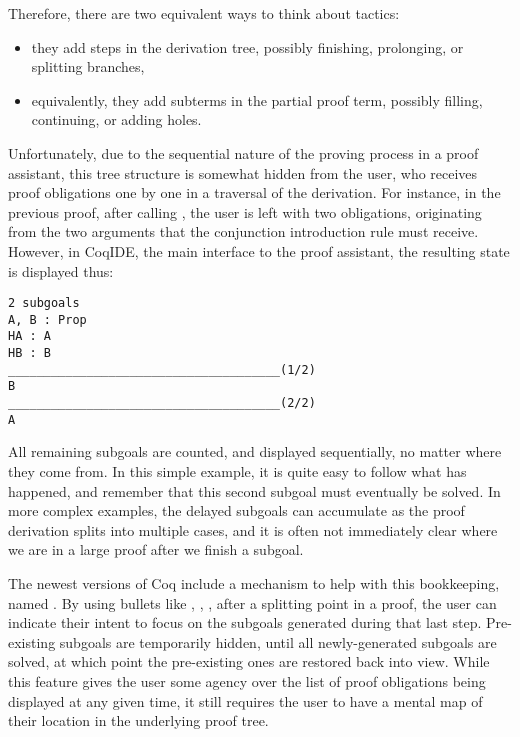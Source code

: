 Therefore, there are two equivalent ways to think about tactics:

\begin{itemize}

  \item they add steps in the derivation tree, possibly finishing, prolonging, or splitting branches,

  \item equivalently, they add subterms in the partial proof term, possibly filling, continuing, or adding holes.

\end{itemize}

Unfortunately, due to the sequential nature of the proving process in a proof
assistant, this tree structure is somewhat hidden from the user, who receives
proof obligations one by one in a traversal of the derivation.  For instance, in
the previous proof, after calling , the user is left with two
obligations, originating from the two arguments that the conjunction
introduction rule must receive.  However, in CoqIDE, the main interface to the
proof assistant, the resulting state is displayed thus:

\begin{verbatim}
2 subgoals
A, B : Prop
HA : A
HB : B
______________________________________(1/2)
B
______________________________________(2/2)
A
\end{verbatim}

All remaining subgoals are counted, and displayed sequentially, no matter where
they come from.  In this simple example, it is quite easy to follow what has
happened, and remember that this second subgoal must eventually be solved.  In
more complex examples, the delayed subgoals can accumulate as the proof
derivation splits into multiple cases, and it is often not immediately clear
where we are in a large proof after we finish a subgoal.

The newest versions of Coq include a mechanism to help with this bookkeeping,
named .  By using bullets like \coqinline{+}, \coqinline{-},
\coqinline{*}, after a splitting point in a proof, the user can indicate their
intent to focus on the subgoals generated during that last step.  Pre-existing
subgoals are temporarily hidden, until all newly-generated subgoals are solved,
at which point the pre-existing ones are restored back into view.  While this
feature gives the user some agency over the list of proof obligations being
displayed at any given time, it still requires the user to have a mental map of
their location in the underlying proof tree.

